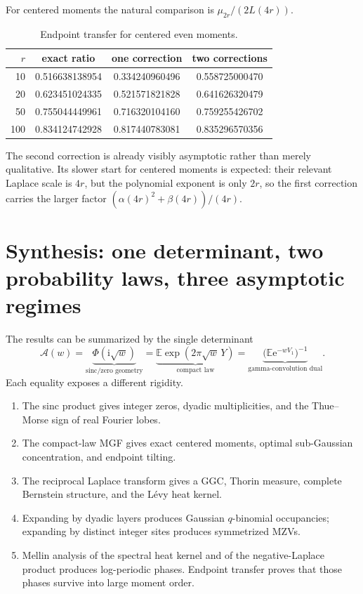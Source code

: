 \documentclass[11pt]{article}
\numberwithin{equation}{section}
\theoremstyle{definition}
\theoremstyle{remark}
\newcommand{\E}{\mathbb E}
\newcommand{\e}{\mathrm e}
\newcommand{\ii}{\mathrm i}
\begin{document}
For centered moments the natural comparison is
$\mu_{2r}/(2L(4r))$.

\begin{table}[ht]
\centering
\caption{Endpoint transfer for centered even moments.}
\label{p5:tab:centered-transfer}
\begin{tabular}{@{}rccc@{}}
\toprule
$r$ & exact ratio & one correction & two corrections\\
\midrule
10  & 0.516638138954 & 0.334240960496 & 0.558725000470\\
20  & 0.623451024335 & 0.521571821828 & 0.641626320479\\
50  & 0.755044449961 & 0.716320104160 & 0.759255426702\\
100 & 0.834124742928 & 0.817440783081 & 0.835296570356\\
\bottomrule
\end{tabular}
\end{table}

The second correction is already visibly asymptotic rather than merely
qualitative.  Its slower start for centered moments is expected: their
relevant Laplace scale is $4r$, but the polynomial exponent is only $2r$, so
the first correction carries the larger factor
$(\alpha(4r)^2+\beta(4r))/(4r)$.

\section{Synthesis: one determinant, two probability laws, three asymptotic regimes}

The results can be summarized by the single determinant
\begin{equation}\label{p5:eq:synthesis-A}
 \mathcal A(w)=
 \underbrace{\Phi(\ii\sqrt w)}_{\text{sinc/zero geometry}}
 =\underbrace{\E\exp(2\pi\sqrt w\,Y)}_{\text{compact law}}
 =\underbrace{\bigl(\E\e^{-wV_1}\bigr)^{-1}}_{\text{gamma-convolution dual}}.
\end{equation}
Each equality exposes a different rigidity.

\begin{enumerate}
\item The sinc product gives integer zeros, dyadic multiplicities, and the
      Thue--Morse sign of real Fourier lobes.
\item The compact-law MGF gives exact centered moments, optimal sub-Gaussian
      concentration, and endpoint tilting.
\item The reciprocal Laplace transform gives a GGC, Thorin measure, complete
      Bernstein structure, and the L\'evy heat kernel.
\item Expanding by dyadic layers produces Gaussian $q$-binomial occupancies;
      expanding by distinct integer sites produces symmetrized MZVs.
\item Mellin analysis of the spectral heat kernel and of the negative-Laplace
      product produces log-periodic phases.  Endpoint transfer proves that
      those phases survive into large moment order.
\end{enumerate}
\end{document}
